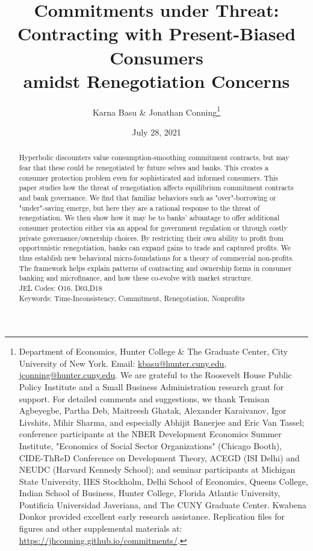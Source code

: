 \documentclass[11pt,english]{article}
\date{July 28, 2021}\usepackage{babel}
\theoremstyle{plain}
\theoremstyle{definition}
\begin{document}

\title{Commitments under Threat:\\Contracting with Present-Biased Consumers\\amidst Renegotiation Concerns}

\author{Karna Basu \& Jonathan Conning\thanks{Department of Economics, Hunter College \& The Graduate Center, City
University of New York. Email: \href{mailto:kbasu@hunter.cuny.edu}{kbasu@hunter.cuny.edu}, \href{mailto:jconning@hunter.cuny.edu}{jconning@hunter.cuny.edu}.
We are grateful to the Roosevelt House Public Policy Institute and
a Small Business Administration research grant for support. For detailed
comments and suggestions, we thank Temisan Agbeyegbe, Partha Deb, Maitreesh Ghatak, Alexander Karaivanov, Igor Livshits, Mihir Sharma, and especially Abhijit Banerjee and Eric Van Tassel; conference participants at the NBER Development
Economics Summer Institute, "Economics of Social Sector Organizations"
(Chicago Booth), CIDE-ThReD Conference on Development Theory, ACEGD
(ISI Delhi) and NEUDC (Harvard Kennedy School); and seminar participants
at Michigan State University, IIES Stockholm, Delhi School of Economics,
Queens College, Indian School of Business, Hunter College, Florida
Atlantic University, Pontificia Universidad Javeriana, and The CUNY Graduate
Center. Kwabena Donkor provided excellent early research assistance.
Replication files for figures and other supplemental materials at:
\protect\url{https://jhconning.github.io/commitments/}.}}




\maketitle

\begin{abstract}
Hyperbolic discounters value consumption-smoothing commitment contracts, but may fear that these could be renegotiated by future selves and banks. This creates a consumer protection problem even for sophisticated and informed consumers. This paper studies how the threat of renegotiation affects equilibrium commitment contracts and bank governance. We find that familiar behaviors such as "over"-borrowing or "under"-saving emerge, but here they are a rational response to the threat of renegotiation. We then show how it may be to banks' advantage to offer additional consumer protection either via an appeal for government regulation or through costly private governance/ownership choices. By restricting their own ability to profit from opportunistic renegotiation, banks can expand gains to trade and captured profits. We thus establish new behavioral micro-foundations for a theory of commercial non-profits. The framework helps explain patterns of contracting and ownership forms in consumer banking and microfinance, and how these co-evolve with market structure.   
\\JEL Codes: O16, D03,D18 
\\Keywords: Time-Inconsistency, Commitment, Renegotiation, Nonprofits
\end{abstract}
\vspace{\baselineskip}
\end{document}
